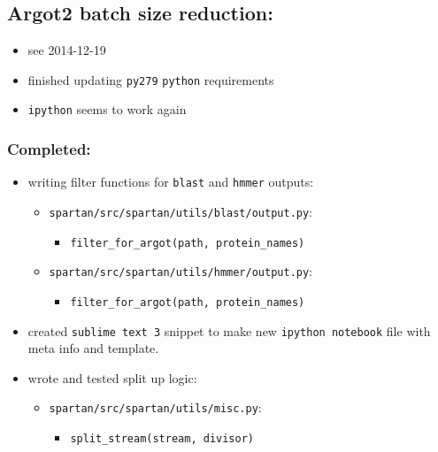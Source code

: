\documentclass[letterpaper]{scrartcl}
\begin{document}
\subsection{Argot2 batch size
reduction:}\label{argot2-batch-size-reduction-1}

\begin{itemize}
\itemsep1pt\parskip0pt
\item
  see 2014-12-19
\item
  finished updating \texttt{py279} \texttt{python} requirements
\item
  \texttt{ipython} seems to work again
\end{itemize}

\subsubsection{Completed:}\label{completed}

\begin{itemize}
\itemsep1pt\parskip0pt
\item
  writing filter functions for \texttt{blast} and \texttt{hmmer}
  outputs:

  \begin{itemize}
  \itemsep1pt\parskip0pt
  \item
    \texttt{spartan/src/spartan/utils/blast/output.py}:

    \begin{itemize}
    \itemsep1pt\parskip0pt
    \item
      \texttt{filter\_for\_argot(path, protein\_names)}
    \end{itemize}
  \item
    \texttt{spartan/src/spartan/utils/hmmer/output.py}:

    \begin{itemize}
    \itemsep1pt\parskip0pt
    \item
      \texttt{filter\_for\_argot(path, protein\_names)}
    \end{itemize}
  \end{itemize}
\item
  created \texttt{sublime text 3} snippet to make new
  \texttt{ipython notebook} file with meta info and template.
\item
  wrote and tested split up logic:

  \begin{itemize}
  \itemsep1pt\parskip0pt
  \item
    \texttt{spartan/src/spartan/utils/misc.py}:

    \begin{itemize}
    \itemsep1pt\parskip0pt
    \item
      \texttt{split\_stream(stream, divisor)}
    \end{itemize}
  \end{itemize}
\end{itemize}
\end{document}
